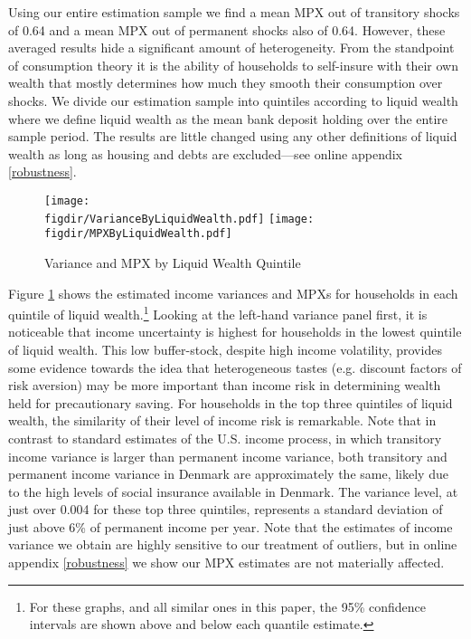 \documentclass[titlepage]{\econtex}\newcommand{\texname}{ConsumptionHeterogeneity}
\newcommand{\figdir}{../Code/Rcode/Figures/AEJ_revision}
\begin{document}
	Using our entire estimation sample we find a mean MPX out of transitory shocks of 0.64 and a mean MPX out of permanent shocks also of 0.64. However, these averaged results hide a significant amount of heterogeneity. From the standpoint of consumption theory it is the ability of households to self-insure with their own wealth that mostly determines how much they smooth their consumption over shocks. We divide our estimation sample into quintiles according to liquid wealth where we define liquid wealth as the mean bank deposit holding over the entire sample period. The results are little changed using any other definitions of liquid wealth as long as housing and debts are excluded---see online appendix \ref{robustness}.
	\begin{figure}
		\centering
		\texttt{[image: \\figdir/VarianceByLiquidWealth.pdf]}
		\centering
		\texttt{[image: \\figdir/MPXByLiquidWealth.pdf]}
		\caption{Variance and MPX by Liquid Wealth Quintile}
		\label{fig:MPXByLiquidWealth}
	\end{figure}
	
	Figure \ref{fig:MPXByLiquidWealth} shows the estimated income variances and MPXs for households in each quintile of liquid wealth.\footnote{For these graphs, and all similar ones in this paper, the 95\% confidence intervals are shown above and below each quantile estimate.} Looking at the left-hand variance panel first, it is noticeable that income uncertainty is highest for households in the lowest quintile of liquid wealth. This low buffer-stock, despite high income volatility, provides some evidence towards the idea that heterogeneous tastes (e.g. discount factors of risk aversion) may be more important than income risk in determining wealth held for precautionary saving. For households in the top three quintiles of liquid wealth, the similarity of their level of income risk is remarkable. Note that in contrast to standard estimates of the U.S. income process, in which transitory income variance is larger than permanent income variance, both transitory and permanent income variance in Denmark are approximately the same, likely due to the high levels of social insurance available in Denmark. The variance level, at just over 0.004 for these top three quintiles, represents a standard deviation of just above 6\% of permanent income per year. Note that the estimates of income variance we obtain are highly sensitive to our treatment of outliers, but in online appendix \ref{robustness} we show our MPX estimates are not materially affected.
	
\end{document}
